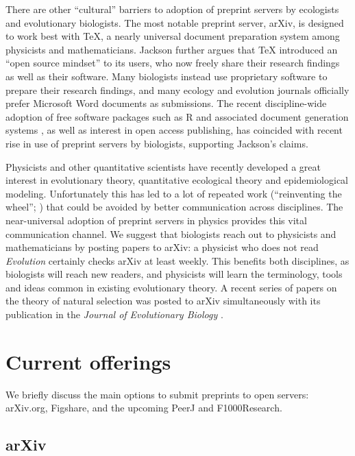 \documentclass[letterpaper,twocolumn,superscriptaddress,showkeys]{revtex4}
\begin{document}
There are other ``cultural'' barriers to adoption of preprint servers by
ecologists and evolutionary biologists.  The most notable preprint server,
arXiv, is designed to work best with \TeX{}, a nearly universal document
preparation system among physicists and mathematicians.  Jackson
\cite{jackson2002preprints} further argues that \TeX{} introduced an ``open
source mindset'' to its users, who now freely share their research findings as
well as their software.  Many biologists instead use proprietary software to
prepare their research findings, and many ecology and evolution journals
officially prefer Microsoft Word documents as submissions.  The recent
discipline-wide adoption of free software packages such as R and associated
document generation systems \cite{xie2012}, as well as interest in open access
publishing, has coincided with recent rise in use of preprint servers by
biologists, supporting Jackson's claims. \cite{xie12}

Physicists and other quantitative scientists have recently developed a
great interest in evolutionary theory, quantitative ecological theory
and epidemiological modeling.  Unfortunately this has led to a lot of
repeated work (``reinventing the wheel''; \cite{de2011contribution})
that could be avoided by better communication across disciplines.  The
near-universal adoption of preprint servers in physics provides this
vital communication channel.  We suggest that biologists reach out to
physicists and mathematicians by posting papers to arXiv: a physicist
who does not read \emph{Evolution} certainly checks arXiv at least
weekly.  This benefits both disciplines, as biologists will reach new
readers, and physicists will learn the terminology, tools and ideas
common in existing evolutionary theory.  A recent series of papers on
the theory of natural selection was posted to arXiv simultaneously
with its publication in the \emph{Journal of Evolutionary Biology}
\cite{JEB:JEB2431,JEB:JEB2498,JEB:JEB2378,JEB:JEB2373}.

\section{Current offerings}

We briefly discuss the main options to submit preprints to open servers:
arXiv.org, Figshare, and the upcoming PeerJ and F1000Research.

\subsection{arXiv}
\end{document}
